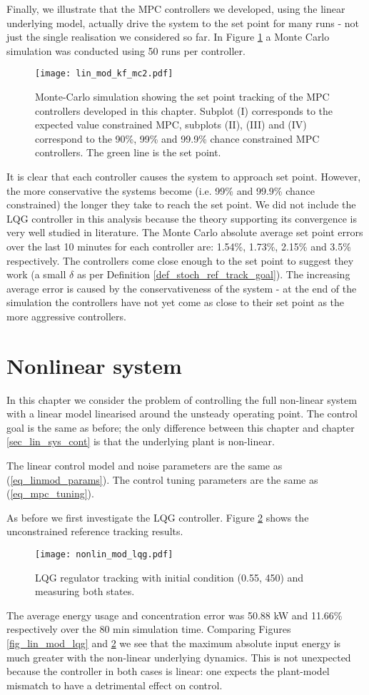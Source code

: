 Finally, we illustrate that the MPC controllers we developed, using the linear underlying model, actually drive the system to the set point for many runs - not just the single realisation we considered so far. In Figure \ref{fig_lin_mod_kf_mc2} a Monte Carlo simulation was conducted using 50 runs per controller.
\begin{figure}[H] 
\centering
\texttt{[image: lin\_mod\_kf\_mc2.pdf]}
\caption{Monte-Carlo simulation showing the set point tracking of the MPC controllers developed in this chapter. Subplot (I) corresponds to the expected value constrained MPC, subplots (II), (III) and (IV) correspond to the 90\%, 99\% and 99.9\% chance constrained MPC controllers. The green line is the set point.}
\label{fig_lin_mod_kf_mc2}
\end{figure}
It is clear that each controller causes the system to approach set point. However, the more conservative the systems become (i.e. 99\% and 99.9\% chance constrained) the longer they take to reach the set point. We did not include the LQG controller in this analysis because the theory supporting its convergence is very well studied in literature. The Monte Carlo absolute average set point errors over the last 10 minutes for each controller are: 1.54\%, 1.73\%, 2.15\% and 3.5\% respectively. The controllers come close enough to the set point to suggest they work (a small $\delta$ as per Definition \ref{def_stoch_ref_track_goal}). The increasing average error is caused by the conservativeness of the system - at the end of the simulation the controllers have not yet come as close to their set point as the more aggressive controllers. 

\section{Nonlinear system}
\label{sec_nonlinear_control}
In this chapter we consider the problem of controlling the full non-linear system with a linear model linearised around the unsteady operating point. The control goal is the same as before; the only difference between this chapter and chapter \ref{sec_lin_sys_cont} is that the underlying plant is non-linear.

The linear control model and noise parameters are the same as (\ref{eq_linmod_params}). The control tuning parameters are the same as (\ref{eq_mpc_tuning}).

As before we first investigate the LQG controller. Figure \ref{fig_nonlin_lqg} shows the unconstrained reference tracking results.
\begin{figure}[H] 
\centering
\texttt{[image: nonlin\_mod\_lqg.pdf]}
\caption{LQG regulator tracking with initial condition (0.55, 450) and measuring both states.}
\label{fig_nonlin_lqg}
\end{figure}
The average energy usage and concentration error was 50.88 kW and 11.66\% respectively over the 80 min simulation time. Comparing Figures \ref{fig_lin_mod_lqg} and \ref{fig_nonlin_lqg} we see that the maximum absolute input energy is much greater with the non-linear underlying dynamics. This is not unexpected because the controller in both cases is linear: one expects the plant-model mismatch to have a detrimental effect on control.

